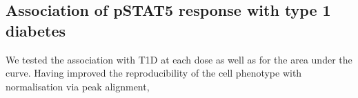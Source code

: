 
\subsection{Association of pSTAT5 response with type 1 diabetes}

We tested the association with T1D at each dose as well as for the area under the curve.
Having improved the reproducibility of the cell phenotype with normalisation via peak alignment,

